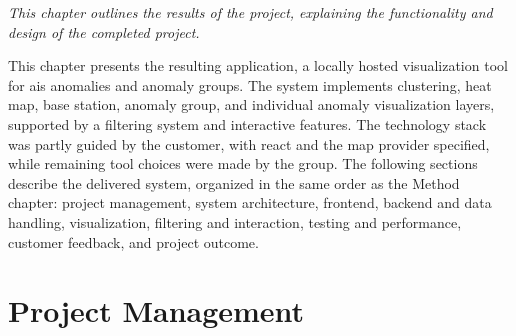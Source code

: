 \textit{This chapter outlines the results of the project, explaining the functionality and design of the completed project.}

This chapter presents the resulting application, a locally hosted visualization tool for \acrshort{ais} anomalies and anomaly groups. The system implements clustering, heat map, base station, anomaly group, and individual anomaly visualization layers, supported by a filtering system and interactive features. The technology stack was partly guided by the customer, with \gls{react} and the map provider specified, while remaining tool choices were made by the group. The following sections describe the delivered system, organized in the same order as the Method chapter: project management, system architecture, frontend, backend and data handling, visualization, filtering and interaction, testing and performance, customer feedback, and project outcome.

\newpage
\section{Project Management}
\label{sec:results_project_management}


